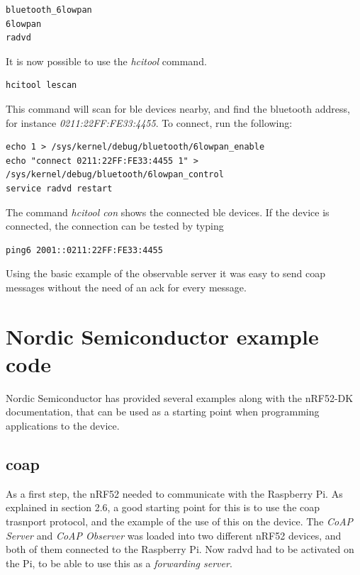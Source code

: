 \begin{verbatim}
bluetooth_6lowpan
6lowpan
radvd
\end{verbatim}

It is now possible to use the \textit{hcitool} command. 

\begin{verbatim}
hcitool lescan
\end{verbatim}

This command will scan for \gls{ble} devices nearby, and find the bluetooth address, for instance \textit{0211:22FF:FE33:4455}. To connect, run the following: 

\begin{verbatim}
echo 1 > /sys/kernel/debug/bluetooth/6lowpan_enable
echo "connect 0211:22FF:FE33:4455 1" > /sys/kernel/debug/bluetooth/6lowpan_control
service radvd restart
\end{verbatim}

The command \textit{hcitool con} shows the connected \gls{ble} devices. If the device is connected, the connection can be tested by typing

\begin{verbatim}
ping6 2001::0211:22FF:FE33:4455
\end{verbatim}


Using the basic example of the observable server it was easy to send \gls{coap} messages without the need of an \gls{ack} for every message. 


\section{Nordic Semiconductor example code}

Nordic Semiconductor has provided several examples along with the nRF52-DK documentation, that can be used as a starting point when programming applications to the device. 

\subsection{\gls{coap}}

As a first step, the nRF52 needed to communicate with the Raspberry Pi. As explained in section 2.6, a good starting point for this is to use the \gls{coap} trasnport protocol, and the example of the use of this on the device. The \textit{CoAP Server} and \textit{CoAP Observer} was loaded into two different nRF52 devices, and both of them connected to the Raspberry Pi. Now \gls{radvd} had to be activated on the Pi, to be able to use this as a \textit{forwarding server}. 

